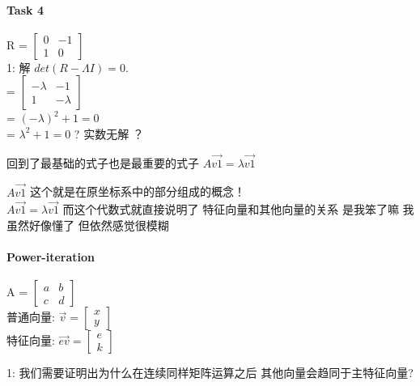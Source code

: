 \documentclass[12pt]{article}
\begin{document}
\paragraph{Task 4}
\begin{flushleft}
    R = $\begin{bmatrix}
            0 & -1 \\
            1 & 0
        \end{bmatrix}$ \\
    1: 解 $det(R- \Lambda I) = 0$. \\
    = $\begin{bmatrix}
            -\lambda & -1       \\
            1        & -\lambda
        \end{bmatrix}$  \\
    = $(-\lambda)^{2} + 1 = 0$ \\
    = $ \lambda ^{2} + 1 = 0 $ ? 实数无解 ？ \\
\end{flushleft}

回到了最基础的式子也是最重要的式子
$A\vec{v1} = \lambda \vec{v1}$

$A\vec{v1}$ 这个就是在原坐标系中的部分组成的概念！\\
$A\vec{v1} = \lambda \vec{v1}$ 而这个代数式就直接说明了
特征向量和其他向量的关系
是我笨了嘛 我虽然好像懂了 但依然感觉很模糊


\paragraph{Power-iteration}
\begin{flushleft}
    A = $\begin{bmatrix}
            a & b \\
            c & d
        \end{bmatrix}$ \\
    普通向量: $\vec{v} =\begin{bmatrix}
            x \\
            y
        \end{bmatrix}$ \\
    特征向量: $\vec{ev} = \begin{bmatrix}
            e \\
            k
        \end{bmatrix}$

    1: 我们需要证明出为什么在连续同样矩阵运算之后 其他向量会趋同于主特征向量? \\


\end{flushleft}
\end{document}
